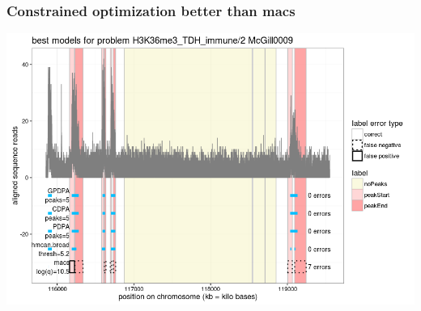 \documentclass{beamer}
\begin{document}
\begin{frame}
  \frametitle{Constrained optimization better than macs}
  \includegraphics[width=\textwidth]{figure-min-train-error-problem5-best}
\end{frame}
\end{document}
